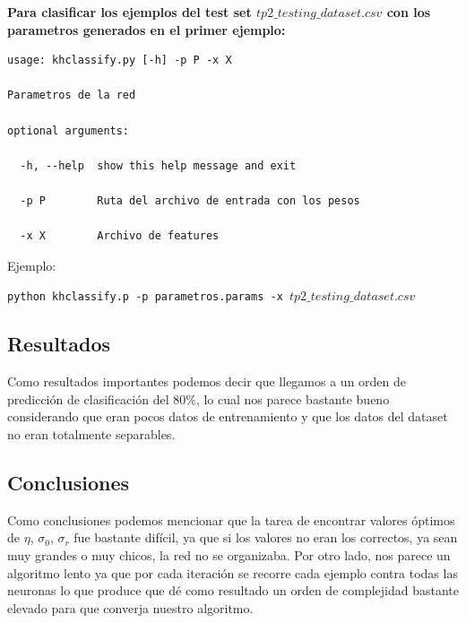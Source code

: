 \textbf{Para clasificar los ejemplos del test set $tp2\_testing\_dataset.csv$ con los parametros generados en el primer ejemplo:}

\begin{lstlisting}[style=bash]
usage: khclassify.py [-h] -p P -x X

Parametros de la red

optional arguments:

  -h, --help  show this help message and exit

  -p P        Ruta del archivo de entrada con los pesos

  -x X        Archivo de features
\end{lstlisting}

Ejemplo:

\noindent\texttt{python khclassify.p -p parametros.params -x $tp2\_testing\_dataset.csv$} \\

\subsection{Resultados}
Como resultados importantes podemos decir que llegamos a un orden de predicción de clasificación del 80$\%$, lo cual nos parece bastante bueno considerando que eran pocos datos de entrenamiento y que los datos del dataset no eran totalmente separables.

\subsection{Conclusiones}
Como conclusiones podemos mencionar que la tarea de encontrar valores óptimos de $\eta$, $\sigma_{0}$, $\sigma_{r}$ fue bastante difícil, ya que si los valores no eran los correctos, ya sean muy grandes o muy chicos, la red no se organizaba.
Por otro lado, nos parece un algoritmo lento ya que por cada iteración se recorre cada ejemplo contra todas las neuronas lo que produce que dé como resultado un orden de complejidad bastante elevado para que converja nuestro algoritmo.
